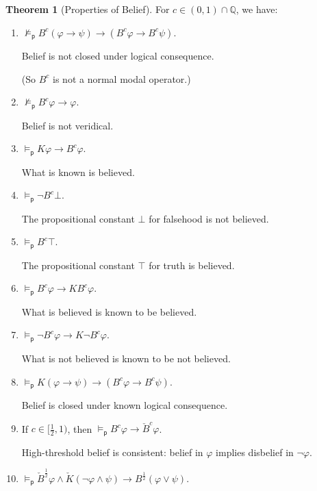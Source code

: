\documentclass[12pt]{article}
\theoremstyle{definition}
\newtheorem{theorem}{Theorem}[section]
\newcommand{\Rat}{\mathbb{Q}}  %
\newcommand{\modelsp}{\models_{\mathsf{p}}}                  %
\begin{document}
\begin{theorem}[Properties of Belief]
  \label{theorem:belief}
  For $c\in(0,1)\cap\Rat$, we have:
  \begin{enumerate}
  \item \label{item:B-not-normal}
    $\not\modelsp B^c(\varphi\to\psi)\to(B^c\varphi\to B^c\psi)$.

    Belief is not closed under logical consequence.

    (So $B^c$ is not a normal modal operator.)

  \item \label{item:B-not-T} $\not\modelsp B^c\varphi\to\varphi$.

    Belief is not veridical.

  \item \label{item:B-C} $\modelsp K\varphi\to B^c\varphi$.

    What is known is believed.

  \item \label{item:B-B} $\modelsp\lnot B^c\bot$.

    The propositional constant $\bot$ for falsehood is not believed.

  \item \label{item:B-N} $\modelsp B^c\top$.

    The propositional constant $\top$ for truth is believed.

  \item \label{item:B-Ap} $\modelsp B^c\varphi\to KB^c\varphi$.

    What is believed is known to be believed.

  \item \label{item:B-An} $\modelsp \lnot B^c\varphi\to K\lnot B^c\varphi$.

    What is not believed is known to be not believed.

  \item \label{item:B-M}
    $\modelsp K(\varphi\to\psi)\to(B^c\varphi\to B^c\psi)$.

    Belief is closed under known logical consequence.

  \item \label{item:B-D} If $c\in[\frac 12,1)$, then
    $\modelsp B^c\varphi\to \check B^c\varphi$.

    High-threshold belief is consistent: belief in $\varphi$ implies
    disbelief in $\lnot\varphi$.

  \item \label{item:B-SC}
    $\modelsp \check{B}^{\frac 12} \varphi \land \check{K}(\neg \varphi
    \land \psi) \rightarrow B^{\frac 12} (\varphi \lor \psi)$.
    

\end{enumerate}
\end{theorem}
\end{document}
